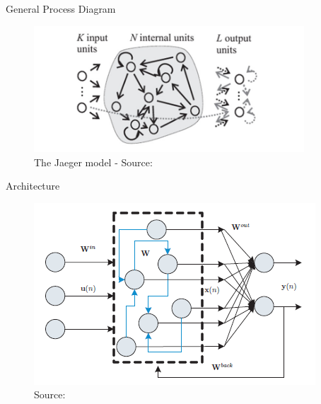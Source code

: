 \begin{frame}{General Process Diagram}
	\begin{figure}
		\includegraphics[width=0.9\textwidth, height=0.7\textheight]{images/diagramaESN.jpg}
		\caption{The Jaeger model - Source:\cite{1}}
	\end{figure}
\end{frame}


\begin{frame}{Architecture}
	\begin{figure}
		\includegraphics[width=.6\textwidth]{images/arquitetura_.png}
		\caption{Source: \cite{4}}
	\end{figure}
\end{frame}

